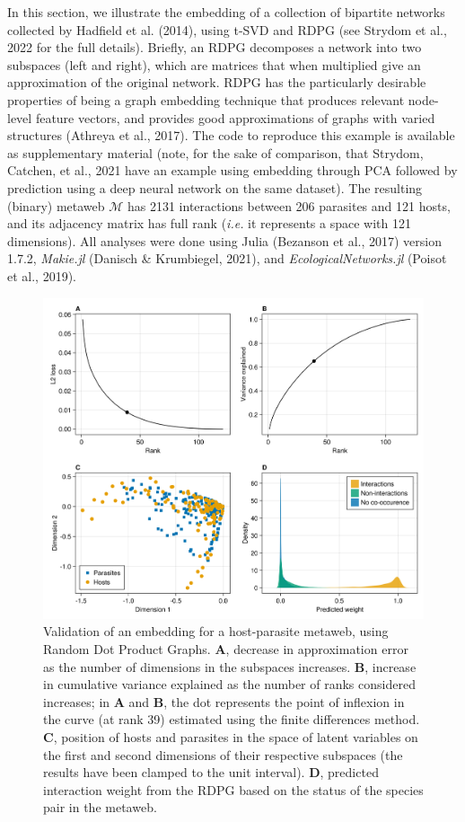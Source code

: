 \documentclass[11pt]{article}
\makeatletter
\def\maxwidth{\ifdim\Gin@nat@width>\linewidth\linewidth
\else\Gin@nat@width\fi}
\let\Oldincludegraphics\includegraphics
\renewcommand{\includegraphics}[1]{\Oldincludegraphics[width=\maxwidth]{#1}}
\makeatother
\begin{document}
In this section, we illustrate the embedding of a collection of
bipartite networks collected by Hadfield et al. (2014), using t-SVD and
RDPG (see Strydom et al., 2022 for the full details). Briefly, an RDPG
decomposes a network into two subspaces (left and right), which are
matrices that when multiplied give an approximation of the original
network. RDPG has the particularly desirable properties of being a graph
embedding technique that produces relevant node-level feature vectors,
and provides good approximations of graphs with varied structures
(Athreya et al., 2017). The code to reproduce this example is available
as supplementary material (note, for the sake of comparison, that
Strydom, Catchen, et al., 2021 have an example using embedding through
PCA followed by prediction using a deep neural network on the same
dataset). The resulting (binary) metaweb \(\mathcal{M}\) has 2131
interactions between 206 parasites and 121 hosts, and its adjacency
matrix has full rank (\emph{i.e.} it represents a space with 121
dimensions). All analyses were done using Julia (Bezanson et al., 2017)
version 1.7.2, \emph{Makie.jl} (Danisch \& Krumbiegel, 2021), and
\emph{EcologicalNetworks.jl} (Poisot et al., 2019).

\begin{figure}
\hypertarget{fig:illustration1}{%
\centering
\includegraphics{figures/illustration-part1.png}
\caption{Validation of an embedding for a host-parasite metaweb, using
Random Dot Product Graphs. \textbf{A}, decrease in approximation error
as the number of dimensions in the subspaces increases. \textbf{B},
increase in cumulative variance explained as the number of ranks
considered increases; in \textbf{A} and \textbf{B}, the dot represents
the point of inflexion in the curve (at rank 39) estimated using the
finite differences method. \textbf{C}, position of hosts and parasites
in the space of latent variables on the first and second dimensions of
their respective subspaces (the results have been clamped to the unit
interval). \textbf{D}, predicted interaction weight from the RDPG based
on the status of the species pair in the
metaweb.}\label{fig:illustration1}
}
\end{figure}
\end{document}
